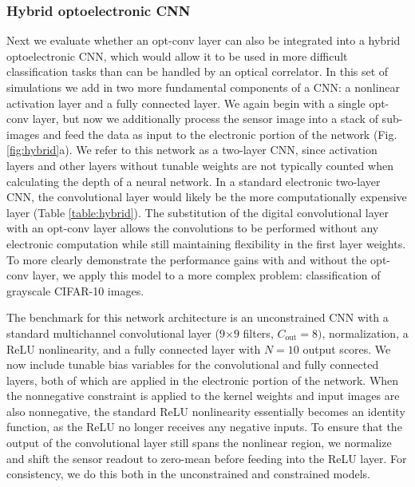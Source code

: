 \documentclass[fleqn,10pt]{wlscirep}
\begin{document}
\subsubsection*{Hybrid optoelectronic CNN} 
Next we evaluate whether an opt-conv layer can also be integrated into a hybrid optoelectronic CNN, which would allow it to be used in more difficult classification tasks than can be handled by an optical correlator. In this set of simulations we add in two more fundamental components of a CNN: a nonlinear activation layer and a fully connected layer. We again begin with a single opt-conv layer, but now we additionally process the sensor image into a stack of sub-images and feed the data as input to the electronic portion of the network (Fig. \ref{fig:hybrid}a). We refer to this network as a two-layer CNN, since activation layers and other layers without tunable weights are not typically counted when calculating the depth of a neural network. In a standard electronic two-layer CNN, the convolutional layer would likely be the more computationally expensive layer (Table \ref{table:hybrid}). The substitution of the digital convolutional layer with an opt-conv layer allows the convolutions to be performed without any electronic computation while still maintaining flexibility in the first layer weights. To more clearly demonstrate the performance gains with and without the opt-conv layer, we apply this model to a more complex problem: classification of grayscale CIFAR-10 images. 

The benchmark for this network architecture is an unconstrained CNN with a standard multichannel convolutional layer ($9$$\times$$9$ filters, $C_\text{out} = 8)$, normalization, a ReLU nonlinearity, and a fully connected layer with $N=10$ output scores. We now include tunable bias variables for the convolutional and fully connected layers, both of which are applied in the electronic portion of the network. When the nonnegative constraint is applied to the kernel weights and input images are also nonnegative, the standard ReLU nonlinearity essentially becomes an identity function, as the ReLU no longer receives any negative inputs. To ensure that the output of the convolutional layer still spans the nonlinear region, we normalize and shift the sensor readout to zero-mean before feeding into the ReLU layer. For consistency, we do this both in the unconstrained and constrained models. 
\end{document}
